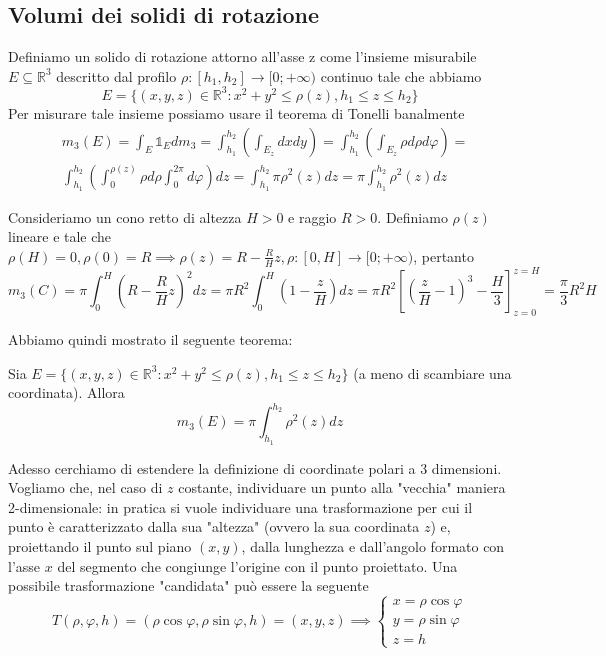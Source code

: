 \subsection{Volumi dei solidi di rotazione}
Definiamo un solido di rotazione attorno all'asse z come l'insieme misurabile $E \subseteq \mathbb{R}^3$ descritto dal profilo $\rho: [h_1, h_2] \to [0; +\infty)$ continuo tale che abbiamo
$$
E = \{(x, y, z) \in \mathbb{R}^3 : x^2 + y^2 \leq \rho(z), h_1 \leq z \leq h_2 \}
$$
Per misurare tale insieme possiamo usare il teorema di Tonelli banalmente
\[\begin{aligned}
&m_3(E) = \int_E \mathbb{1}_E dm_3 = \int_{h_1}^{h_2} \left( \int_{E_z} dxdy \right) = \int_{h_1}^{h_2} \left( \int_{E_z} \rho d\rho d\varphi \right) = \\
&\int_{h_1}^{h_2} \left( \int_0^{\rho(z)} \rho d\rho \int_0^{2\pi} d\varphi \right)dz = \int_{h_1}^{h_2} \pi \rho^2(z) dz = \pi \int_{h_1}^{h_2} \rho^2(z) dz
\end{aligned}\]
%
\vspace{0.5cm}
\begin{example}
Consideriamo un cono retto di altezza $H > 0$ e raggio $R > 0$. Definiamo $\rho(z)$ lineare e tale che $\rho(H) = 0, \rho(0) = R \implies \rho(z) = R - \frac{R}{H}z, \rho: [0, H] \to [0; +\infty)$, pertanto
$$
m_3(C) = \pi \int_0^H \left( R - \frac{R}{H}z \right)^2 dz = \pi R^2 \int_0^H \left(1-\frac{z}{H} \right)dz = \pi R^2 \left[ \left(\frac{z}{H} - 1 \right)^3 - \frac{H}{3} \right]^{z=H}_{z=0} = \frac{\pi}{3} R^2 H
$$
\end{example}
%
\vspace{0.5cm}
Abbiamo quindi mostrato il seguente teorema:
\begin{theorem}
	Sia $E = \{(x, y, z) \in \mathbb{R}^3 : x^2 + y^2 \leq \rho(z), h_1 \leq z \leq h_2 \}$ (a meno di scambiare una coordinata). Allora
	$$
	m_3(E) = \pi \int_{h_1}^{h_2} \rho^2(z)dz
	$$
\end{theorem}
%
Adesso cerchiamo di estendere la definizione di coordinate polari a $3$ dimensioni. Vogliamo che, nel caso di $z$ costante, individuare un punto alla "vecchia" maniera 2-dimensionale: in pratica si vuole individuare una trasformazione per cui il punto è caratterizzato dalla sua "altezza" (ovvero la sua coordinata $z$) e, proiettando il punto sul piano $(x, y)$, dalla lunghezza e dall'angolo formato con l'asse $x$ del segmento che congiunge l'origine con il punto proiettato. Una possibile trasformazione "candidata" può essere la seguente
$$
	T(\rho, \varphi, h) = (\rho \cos{\varphi}, \rho \sin{\varphi}, h) = (x, y, z) \implies \begin{cases} x = \rho \cos{\varphi} \\ y = \rho \sin{\varphi} \\ z = h \end{cases}
$$
